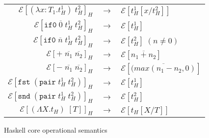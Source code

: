\begin{figure}
\onehalfspacing
\begin{center}
\begin{tabular}{rcl}
$\mathscr{E}[(\lambda x:T_{1}.t_{H}^{1})\;t_{H}^{2}]_{H}$ & $\rightarrow$ & $\mathscr{E}[t_{H}^{1}[x/t_{H}^{2}]]$ \\
$\mathscr{E}[\mathtt{if0}\;\overline{0}\;t_{H}^{1}\;t_{H}^{2}]_{H}$ & $\rightarrow$ & $\mathscr{E}[t_{H}^{1}]$ \\
$\mathscr{E}[\mathtt{if0}\;\overline{n}\;t_{H}^{1}\;t_{H}^{2}]_{H}$ & $\rightarrow$ & $\mathscr{E}[t_{H}^{2}]\;(n\neq0)$ \\
$\mathscr{E}[+\;\overline{n_{1}}\;\overline{n_{2}}]_{H}$ & $\rightarrow$ & $\mathscr{E}[\overline{n_{1}+n_{2}}]$ \\
$\mathscr{E}[-\;\overline{n_{1}}\;\overline{n_{2}}]_{H}$ & $\rightarrow$ & $\mathscr{E}[\overline{(max(n_{1}-n_{2},0)}]$ \\
$\mathscr{E}[\mathtt{fst}\;(\mathtt{pair}\;t_{H}^{1}\;t_{H}^{2})]_{H}$ & $\rightarrow$ & $\mathscr{E}[t_{H}^{1}]$ \\
$\mathscr{E}[\mathtt{snd}\;(\mathtt{pair}\;t_{H}^{1}\;t_{H}^{2})]_{H}$ & $\rightarrow$ & $\mathscr{E}[t_{H}^{2}]$ \\
$\mathscr{E}[(\Lambda X.t_{H})\;[T]]_{H}$ & $\rightarrow$ & $\mathscr{E}[t_{H}[X/T]]$
\end{tabular}
\end{center}
\caption{Haskell core operational semantics}
\label{fig:hcos}
\end{figure}